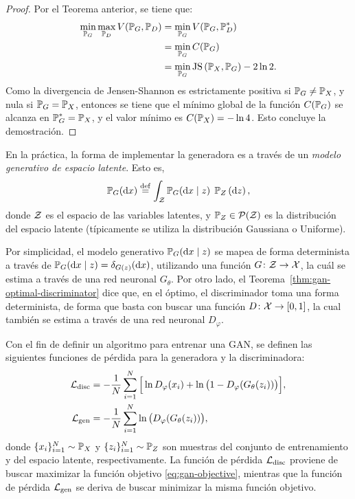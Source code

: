 {{\begin{proof}
    Por el Teorema anterior, se tiene que:
    \begin{align*}
        \min_{\Prob_G} \max_{\Prob_D} V(\Prob_G, \Prob_D)
         & = \min_{\Prob_G} V(\Prob_G, \Prob_D^\ast)         \\
         & = \min_{\Prob_G} C(\Prob_G)                       \\
         & = \min_{\Prob_G} \JS{\Prob_X}{\Prob_G} - 2 \ln 2.
    \end{align*}
    Como la divergencia de Jensen-Shannon es estrictamente positiva si $\Prob_G \neq \Prob_X$, y nula si $\Prob_G = \Prob_X$, entonces se tiene que el mínimo global de la función $C(\Prob_G)$ se alcanza en $\Prob_G^\ast = \Prob_X$, y el valor mínimo es $C(\Prob_X) = - \ln 4$. Esto concluye la demostración.
\end{proof}

En la práctica, la forma de implementar la generadora es a través de un \emph{modelo generativo de espacio latente}. Esto es,
\begin{equation}
    \Prob_G (\dd x) \eqdef \int_\cZ \Prob_G(\dd x \mid z) \; \Prob_Z \left( \dd z\right),
\end{equation}
donde $\mathcal{Z}$ es el espacio de las variables latentes, y $\Prob_Z \in \ProbSpace[\cZ] $ es la distribución del espacio latente (típicamente se utiliza la distribución Gaussiana o Uniforme).

Por simplicidad, el modelo generativo $\Prob_G (\dd x \mid z)$ se mapea de forma determinista a través de $\Prob_G (\dd x \mid z) = \delta_{G(z)}(\dd x)$, utilizando una función $G\colon \mathcal{Z} \to \mathcal{X}$, la cuál se estima a través de una red neuronal $G_\theta$. Por otro lado, el Teorema~\ref{thm:gan-optimal-discriminator} dice que, en el óptimo, el discriminador toma una forma determinista, de forma que basta con buscar una función $D\colon\mathcal{X}\to [0, 1]$, la cual también se estima a través de una red neuronal $D_\varphi$.


Con el fin de definir un algoritmo para entrenar una GAN, se definen las siguientes funciones de pérdida para la generadora y la discriminadora:
\begin{align}
    \cL_{\mathrm{disc}} & = -\frac{1}{N}\sum_{i=1}^{N} \Big[ \ln D_\varphi(x_i) + \ln \qty\big(1 - D_\varphi(G_\theta(z_i))) \Big], \\
    \cL_{\mathrm{gen}}  & = - \frac{1}{N}\sum_{i=1}^{N} \ln \qty\big(D_\varphi(G_\theta(z_i))),
\end{align}
donde $\{x_i\}_{i=1}^{N} \sim \Prob_X$ y $\{z_i\}_{i=1}^{N} \sim \Prob_Z$ son muestras del conjunto de entrenamiento y del espacio latente, respectivamente. La función de pérdida $\mathcal{L}_{\mathrm{disc}}$ proviene de buscar maximizar la función objetivo \eqref{eq:gan-objective}, mientras que la función de pérdida $\mathcal{L}_{\mathrm{gen}}$ se deriva de buscar minimizar la misma función objetivo.

}}
